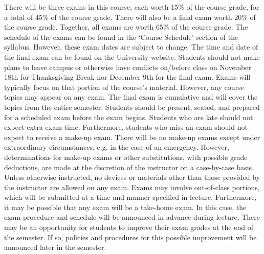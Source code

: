 \documentclass[11pt,letterpaper]{article}
\begin{document}

There will be three exams in this course, each worth 15\% of the course grade, for a total of 45\% of the course grade. There will also be a final exam worth 20\% of the course grade. Together, all exams are worth 65\% of the course grade. The schedule of the exams can be found in the `Course Schedule' section of the syllabus. However, these exam dates are subject to change. The time and date of the final exam can be found on the University website. Students should not make plans to leave campus or otherwise have conflicts on/before class on November 18th for Thanksgiving Break nor December 9th for the final exam. Exams will typically focus on that portion of the course's material. However, any course topics may appear on any exam. The final exam is cumulative and will cover the topics from the entire semester. Students should be present, seated, and prepared for a scheduled exam before the exam begins. Students who are late should not expect extra exam time. Furthermore, students who miss an exam should not expect to receive a make-up exam. There will be no make-up exams except under extraordinary circumstances, e.g. in the case of an emergency. However, determinations for make-up exams or other substitutions, with possible grade deductions, are made at the discretion of the instructor on a case-by-case basis. Unless otherwise instructed, no devices or materials other than those provided by the instructor are allowed on any exam. Exams may involve out-of-class portions, which will be submitted at a time and manner specified in lecture. Furthermore, it may be possible that any exam will be a take-home exam. In this case, the exam procedure and schedule will be announced in advance during lecture. There may be an opportunity for students to improve their exam grades at the end of the semester. If so, policies and procedures for this possible improvement will be announced later in the semester. 
\sectionbreak



\end{document}
